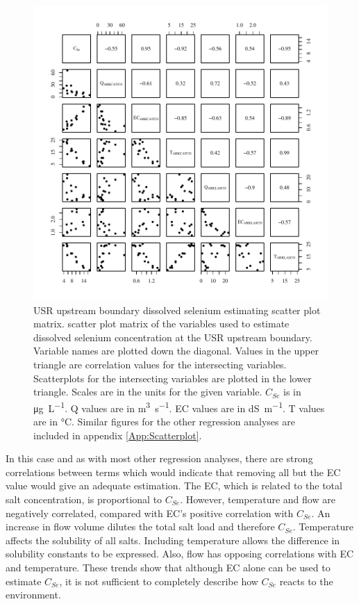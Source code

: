 \begin{linenumbers}
\begin{figure}[htbp]
	\begin{center}
		\includegraphics[width=6in]{"Figures/Results_USR/Conc Model Full PairsU163"}
		\caption[USR upstream boundary dissolved selenium estimating scatter plot matrix.]{USR upstream boundary dissolved selenium estimating scatter plot matrix.  scatter plot matrix of the variables used to estimate dissolved selenium concentration at the USR upstream boundary.  Variable names are plotted down the diagonal.  Values in the upper triangle are correlation values for the intersecting variables.  Scatterplots for the intersecting variables are plotted in the lower triangle.  Scales are in the units for the given variable.  $C_{Se}$ is in \si{\micro\gram\per\liter}.  Q values are in \si{\cubic\meter\per\second}.  EC values are in \si{\deci\siemens\per\meter}.  T values are in \si{\degreeCelsius}.  Similar figures for the other regression analyses are included in appendix \ref{App:Scatterplot}.}
	\label{fig:ExampleFullPairs}
	\end{center}
\end{figure}

In this case and as with most other regression analyses, there are strong correlations between terms which would indicate that removing all but the EC value would give an adequate estimation.  The EC, which is related to the total salt concentration, is proportional to $C_{Se}$.  However, temperature and flow are negatively correlated, compared with EC's positive correlation with $C_{Se}$.  An increase in flow volume dilutes the total salt load and therefore $C_{Se}$.  Temperature affects the solubility of all salts.  Including temperature allows the difference in solubility constants to be expressed.  Also, flow has opposing correlations with EC and temperature.  These trends show that although EC alone can be used to estimate $C_{Se}$, it is not sufficient to completely describe how $C_{Se}$ reacts to the environment.


\end{linenumbers}
